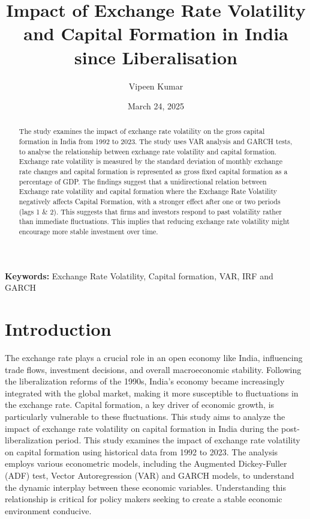\documentclass{article} %
\title{\textbf{Impact of Exchange Rate Volatility and Capital Formation in India since Liberalisation}}
\author{Vipeen Kumar}
\date{March 24, 2025}
\begin{document}
\maketitle

\begin{abstract}
The study examines the impact of exchange rate volatility on the gross capital formation in India from 1992 to 2023. The study uses VAR analysis and GARCH tests, to analyse the relationship between exchange rate volatility and capital formation. Exchange rate volatility is measured by the standard deviation of monthly exchange rate changes and capital formation is represented as gross fixed capital formation as a percentage of GDP. The findings suggest that a unidirectional relation between Exchange rate volatility and capital formation where the Exchange Rate Volatility negatively affects Capital Formation, with a stronger effect after one or two periods (lags 1 \& 2). This suggests that firms and investors respond to past volatility rather than immediate fluctuations. This implies that reducing exchange rate volatility might encourage more stable investment over time.
\end{abstract}

\textbf{Keywords:} Exchange Rate Volatility, Capital formation, VAR, IRF and GARCH

\newpage

\section{Introduction}
The exchange rate plays a crucial role in an open economy like India, influencing trade flows, investment decisions, and overall macroeconomic stability. Following the liberalization reforms of the 1990s, India's economy became increasingly integrated with the global market, making it more susceptible to fluctuations in the exchange rate. Capital formation, a key driver of economic growth, is particularly vulnerable to these fluctuations. This study aims to analyze the impact of exchange rate volatility on capital formation in India during the post-liberalization period. This study examines the impact of exchange rate volatility on capital formation using historical data from 1992 to 2023. The analysis employs various econometric models, including the Augmented Dickey-Fuller (ADF) test, Vector Autoregression (VAR) and GARCH models, to understand the dynamic interplay between these economic variables. Understanding this relationship is critical for policy makers seeking to create a stable economic environment conducive.
\end{document}
